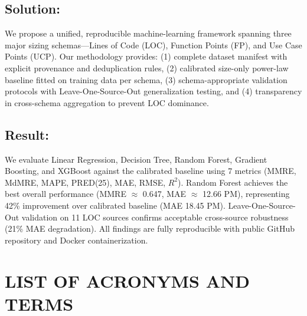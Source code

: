 \documentclass[11pt,a4paper]{article}
\begin{document}
\subsection*{Solution:}
We propose a unified, reproducible machine-learning framework spanning three major sizing schemas—Lines of Code (LOC), Function Points (FP), and Use Case Points (UCP). Our methodology provides: (1) complete dataset manifest with explicit provenance and deduplication rules, (2) calibrated size-only power-law baseline fitted on training data per schema, (3) schema-appropriate validation protocols with Leave-One-Source-Out generalization testing, and (4) transparency in cross-schema aggregation to prevent LOC dominance.

\subsection*{Result:}
We evaluate Linear Regression, Decision Tree, Random Forest, Gradient Boosting, and XGBoost against the calibrated baseline using 7 metrics (MMRE, MdMRE, MAPE, PRED(25), MAE, RMSE, $R^2$). Random Forest achieves the best overall performance (MMRE $\approx$ 0.647, MAE $\approx$ 12.66 PM), representing 42\% improvement over calibrated baseline (MAE 18.45 PM). Leave-One-Source-Out validation on 11 LOC sources confirms acceptable cross-source robustness (21\% MAE degradation). All findings are fully reproducible with public GitHub repository and Docker containerization.

\newpage

\tableofcontents

\newpage

\section*{LIST OF ACRONYMS AND TERMS}
\end{document}
